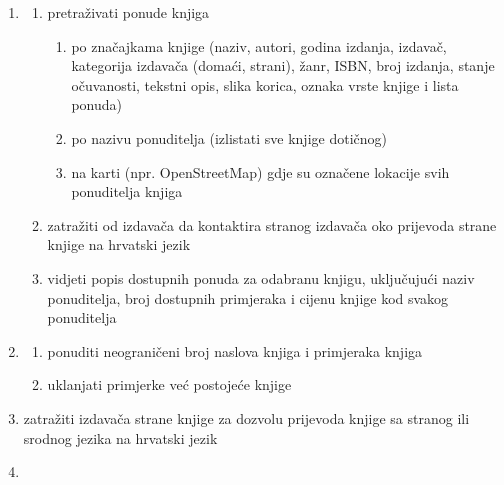 \begin{enumerate}
	\item  {}
	
	\begin{enumerate}
		
		\item pretraživati ponude knjiga
		\begin{enumerate}
			
			\item  po značajkama knjige (naziv, autori, godina izdanja, izdavač,
			kategorija izdavača (domaći, strani), žanr, ISBN, broj izdanja, stanje očuvanosti,
			tekstni opis, slika korica, oznaka vrste knjige i lista ponuda)
			\item  po nazivu ponuditelja (izlistati sve knjige dotičnog)
			\item na karti (npr. OpenStreetMap) gdje su označene lokacije svih ponuditelja knjiga
			
		\end{enumerate}
		\item  zatražiti od izdavača da kontaktira stranog izdavača oko prijevoda strane knjige na hrvatski jezik
		
		\item vidjeti popis dostupnih ponuda za odabranu knjigu, uključujući naziv ponuditelja, broj dostupnih primjeraka i cijenu knjige kod svakog ponuditelja
		
		
		
	\end{enumerate}
	
	\item  {}
	
	\begin{enumerate}
		
		\item ponuditi neograničeni broj naslova knjiga i primjeraka knjiga
		\item uklanjati primjerke već postojeće knjige 
		
	\end{enumerate}
	
	\item {}
	
	zatražiti izdavača strane knjige za dozvolu prijevoda knjige sa stranog ili srodnog jezika na hrvatski jezik
	
	\item {}
	

\end{enumerate}
